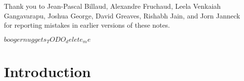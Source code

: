 \vspace{10pt}\noindent Thank you to Jean-Pascal Billaud, Alexandre
Fruchaud, Leela Venkaiah Gangavarapu, Joshua George, David Greaves,
Rishabh Jain, and Jorn Janneck for reporting mistakes in earlier
versions of these notes.

$boogernuggets_TODO_delete_me$

\def\sectionautorefname{Section}%
\def\subsectionautorefname{Section}%
\def\subsubsectionautorefname{Section}%

\nocite{*}

\newpage
\section{Introduction}\label{sec:introduction}


\lipsum[1]


